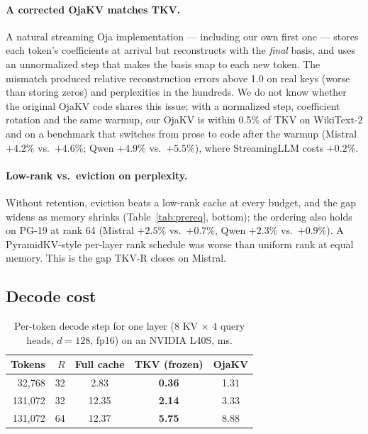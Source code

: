 \documentclass{article}
\begin{document}
\paragraph{A corrected OjaKV matches TKV.} A natural streaming Oja
implementation --- including our own first one --- stores each token's
coefficients at arrival but reconstructs with the \emph{final} basis, and uses
an unnormalized step that makes the basis snap to each new token. The mismatch
produced relative reconstruction errors above 1.0 on real keys (worse than
storing zeros) and perplexities in the hundreds. We do not know whether the
original OjaKV code \citep{ojakov2025} shares this issue; with a normalized step,
coefficient rotation and the same warmup, our OjaKV is within 0.5\% of TKV on
WikiText-2 and on a benchmark that switches from prose to code after the
warmup (Mistral $+4.2\%$ vs.\ $+4.6\%$; Qwen $+4.9\%$ vs.\ $+5.5\%$), where
StreamingLLM costs $+0.2\%$.

\paragraph{Low-rank vs.\ eviction on perplexity.} Without retention, eviction
beats a low-rank cache at every budget, and the gap widens as memory shrinks
(Table~\ref{tab:prereq}, bottom); the ordering also holds on PG-19
\citep{rae2020} at rank 64 (Mistral $+2.5\%$ vs.\ $+0.7\%$, Qwen $+2.3\%$ vs.\
$+0.9\%$). A PyramidKV-style \citep{pyramidkv2024} per-layer rank schedule was
worse than uniform rank at equal memory. This is the gap TKV-R closes on
Mistral.

\subsection{Decode cost}
\label{sec:latency}

\begin{table}[t]
\centering
\caption{Per-token decode step for one layer (8 KV $\times$ 4 query heads,
$d{=}128$, fp16) on an NVIDIA L40S, ms.}
\label{tab:latency}
\small
\begin{tabular}{rrccc}
\toprule
Tokens & $R$ & Full cache & TKV (frozen) & OjaKV \\
\midrule
32,768  & 32 & 2.83 & \textbf{0.36} & 1.31 \\
131,072 & 32 & 12.35 & \textbf{2.14} & 3.33 \\
131,072 & 64 & 12.37 & \textbf{5.75} & 8.88 \\
\bottomrule
\end{tabular}
\end{table}
\end{document}
